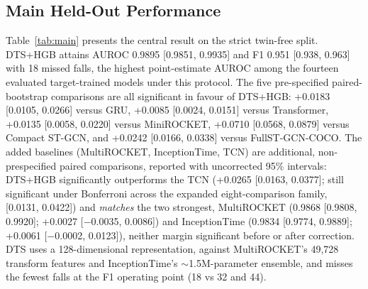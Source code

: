 \subsection{Main Held-Out Performance}
Table~\ref{tab:main} presents the central result on the strict twin-free split. DTS+HGB attains AUROC 0.9895 [0.9851, 0.9935] and F1 0.951 [0.938, 0.963] with 18 missed falls, the highest point-estimate AUROC among the fourteen evaluated target-trained models under this protocol. The five pre-specified paired-bootstrap comparisons are all significant in favour of DTS+HGB: +0.0183 [0.0105, 0.0266] versus GRU, +0.0085 [0.0024, 0.0151] versus Transformer, +0.0135 [0.0058, 0.0220] versus MiniROCKET, +0.0710 [0.0568, 0.0879] versus Compact ST-GCN, and +0.0242 [0.0166, 0.0338] versus FullST-GCN-COCO. The added baselines (MultiROCKET, InceptionTime, TCN) are additional, non-prespecified paired comparisons, reported with uncorrected 95\% intervals: DTS+HGB significantly outperforms the TCN (+0.0265 [0.0163, 0.0377]; still significant under Bonferroni across the expanded eight-comparison family, [0.0131, 0.0422]) and \emph{matches} the two strongest, MultiROCKET (0.9868 [0.9808, 0.9920]; +0.0027 [$-$0.0035, 0.0086]) and InceptionTime (0.9834 [0.9774, 0.9889]; +0.0061 [$-$0.0002, 0.0123]), neither margin significant before or after correction. DTS uses a 128-dimensional representation, against MultiROCKET's 49,728 transform features and InceptionTime's $\sim$1.5M-parameter ensemble, and misses the fewest falls at the F1 operating point (18 vs 32 and 44).

